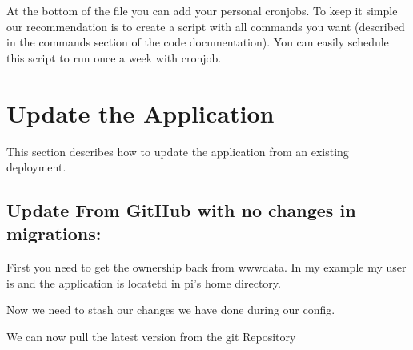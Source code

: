 \documentclass[letterpaper,10pt,english]{sphinxmanual}
\begin{document}
At the bottom of the file you can add your personal cronjobs.
To keep it simple our recommendation is to create a script with all commands you
want (described in the commands section of the code documentation).
You can easily schedule this script to run once a week with cronjob.
\begin{quote}

\end{quote}


\section{Update the Application}
\label{\detokenize{masterAdminDoc:update-the-application}}
This section describes how to update the application from an existing deployment.


\subsection{Update From GitHub with no changes in migrations:}
\label{\detokenize{masterAdminDoc:update-from-github-with-no-changes-in-migrations}}
First you need to get the ownership back from www\sphinxhyphen{}data.
In my example my user is  and the application is locatetd
in pi’s home directory.
\begin{quote}

\begin{DUlineblock}{0em}
\item[] 
\item[] 
\end{DUlineblock}
\end{quote}

Now we need to stash our changes we have done during our config.
\begin{quote}

\end{quote}

We can now pull the latest version from the git Repository
\begin{quote}

\end{quote}
\end{document}
